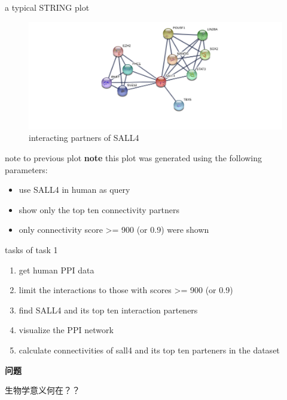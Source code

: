 \documentclass[ignorenonframetext,]{beamer}
\providecommand{\tightlist}{%
  \setlength{\itemsep}{0pt}\setlength{\parskip}{0pt}}
\begin{document}
\begin{frame}{a typical STRING plot}
\protect\hypertarget{a-typical-string-plot}{}
\begin{figure}
\centering
\includegraphics[width=\textwidth,height=0.7\textheight]{images/talk06/string_normal_image.png}
\caption{interacting partners of SALL4}
\end{figure}
\end{frame}

\begin{frame}{note to previous plot}
\protect\hypertarget{note-to-previous-plot}{}
\textbf{note} this plot was generated using the following parameters:

\begin{itemize}
\tightlist
\item
  use SALL4 in human as query
\item
  show only the top ten connectivity partners
\item
  only connectivity score \textgreater= 900 (or 0.9) were shown
\end{itemize}
\end{frame}

\begin{frame}{tasks of task 1}
\protect\hypertarget{tasks-of-task-1}{}
\begin{enumerate}
\tightlist
\item
  get human PPI data
\item
  limit the interactions to those with scores \textgreater= 900 (or 0.9)
\item
  find SALL4 and its top ten interaction parteners
\item
  visualize the PPI network
\item
  calculate connectivities of sall4 and its top ten parteners in the
  dataset
\end{enumerate}

\textbf{问题}

生物学意义何在？？
\end{frame}
\end{document}
